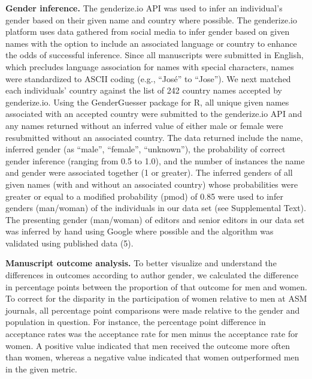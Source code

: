\documentclass[11pt,]{article}
\begin{document}
\textbf{Gender inference.} The genderize.io API was used to infer an
individual's gender based on their given name and country where
possible. The genderize.io platform uses data gathered from social media
to infer gender based on given names with the option to include an
associated language or country to enhance the odds of successful
inference. Since all manuscripts were submitted in English, which
precludes language association for names with special characters, names
were standardized to ASCII coding (e.g., ``José'' to ``Jose''). We next
matched each individuals' country against the list of 242 country names
accepted by genderize.io. Using the GenderGuesser package for R, all
unique given names associated with an accepted country were submitted to
the genderize.io API and any names returned without an inferred value of
either male or female were resubmitted without an associated country.
The data returned include the name, inferred gender (as ``male'',
``female'', ``unknown''), the probability of correct gender inference
(ranging from 0.5 to 1.0), and the number of instances the name and
gender were associated together (1 or greater). The inferred genders of
all given names (with and without an associated country) whose
probabilities were greater or equal to a modified probability (pmod) of
0.85 were used to infer genders (man/woman) of the individuals in our
data set (see Supplemental Text). The presenting gender (man/woman) of
editors and senior editors in our data set was inferred by hand using
Google where possible and the algorithm was validated using published
data (5).

\textbf{Manuscript outcome analysis.} To better visualize and understand
the differences in outcomes according to author gender, we calculated
the difference in percentage points between the proportion of that
outcome for men and women. To correct for the disparity in the
participation of women relative to men at ASM journals, all percentage
point comparisons were made relative to the gender and population in
question. For instance, the percentage point difference in acceptance
rates was the acceptance rate for men minus the acceptance rate for
women. A positive value indicated that men received the outcome more
often than women, whereas a negative value indicated that women
outperformed men in the given metric.
\end{document}
